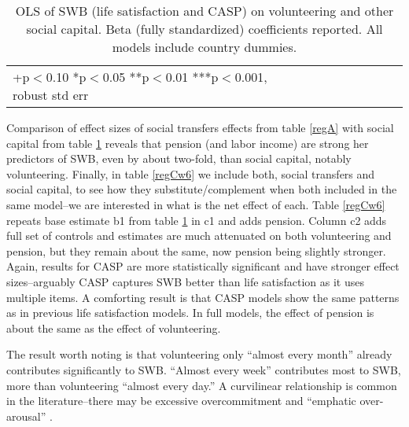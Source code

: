 \documentclass[10pt, letterpaper]{article}
\begin{document}
\begin{spacing}{1.4}
\begin{spacing}{.9}
\begin{table}[H]\centering \caption{OLS of SWB (life satisfaction and CASP) on volunteering
    and other social capital. Beta (fully standardized) coefficients reported. All models
    include country dummies.}  \begin{scriptsize} \begin{tabular}{p{1.8in}p{.5in}p{.5in}p{.5in}p{.5in}|p{.5in}p{.5in}p{.5in}p{.5in}p{.5in}p{.4in}p{.5in}p{.4in}}\hline 
      \hline\multicolumn{5}{l}{+p$<$0.10 *p$<$0.05 **p$<$0.01 ***p$<$0.001,
        robust std err} \end{tabular}\label{regB} \end{scriptsize}\end{table}
\end{spacing}


Comparison of effect sizes of social transfers effects from table \ref{regA} with  
 social capital from table \ref{regB} reveals that pension (and labor income) are
 strong her  predictors of SWB, even by about two-fold,  than social capital, notably volunteering.
%
Finally, in table \ref{regCw6} we include both, social transfers and social
capital,  to see how they substitute/complement
when both included in the same model--we are interested in what is the net
effect of each.
%
Table \ref{regCw6} repeats base estimate b1 from table \ref{regB} in c1 and
adds pension. %
% 
Column c2 adds full set of controls and estimates are much attenuated
on both volunteering and pension, but they remain about the same, now pension
being slightly stronger.
%
Again, results for CASP are more statistically
significant and have stronger effect sizes--arguably CASP captures SWB better
than life satisfaction as it uses multiple items. A comforting result is
that CASP models show the same patterns as in previous life satisfaction
models. In full models, the effect of pension is about the same as the effect of volunteering.


The result worth noting is that volunteering only ``almost every month'' already
contributes significantly to SWB. ``Almost every week'' contributes most
to SWB, more than volunteering ``almost every day.'' A curvilinear
relationship is common in the literature--there may be excessive overcommitment
and ``emphatic over-arousal''  \citep{wilson12B}.%


\end{spacing}
\end{document}
